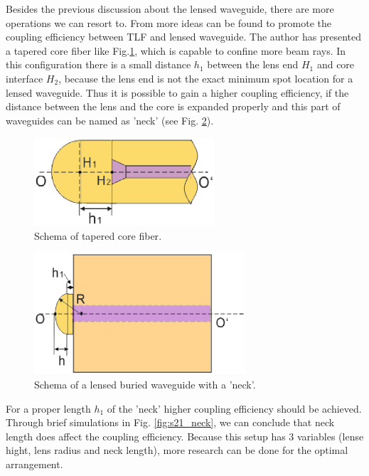 Besides the previous discussion about the lensed waveguide, there are more operations we can resort to. From \cite{integrated_coupling_between_LD_SMF} more ideas can be found to promote the coupling efficiency between TLF and lensed waveguide. The author has presented a tapered core fiber like Fig.\ref{fig:tapered_core_fiber}, which is capable to confine more beam rays. In this configuration there is a small distance $h_{1}$ between the lens end $H_{1}$ and core interface $H_{2}$, because the lens end is not the exact minimum spot location for a lensed waveguide. Thus it is possible to gain a higher coupling efficiency, if the distance between the lens and the core is expanded properly and this part of waveguides can be named as 'neck' (see Fig. \ref{fig:lensed_waveguide_neck}).\\ 

\begin{figure}[!ht]
\centering
\includegraphics[width=0.6\textwidth]{bilder/tapered_core_fiber}
\caption {Schema of tapered core fiber\cite{integrated_coupling_between_LD_SMF}.}
\label{fig:tapered_core_fiber}
\end{figure}
\begin{figure}[!ht]
\centering
\includegraphics[width=0.7\textwidth]{bilder/lensed_waveguide_neck}
\caption {Schema of a lensed buried waveguide with a 'neck'.}
\label{fig:lensed_waveguide_neck}
\end{figure}
For a proper length $h_{1}$ of the 'neck'  higher coupling efficiency should be achieved. Through brief simulations in Fig. \ref{fig:s21_neck}, we can conclude that neck length does affect the coupling efficiency. Because this setup has 3 variables (lense hight, lens radius and neck length), more research can be done for the optimal arrangement.\\

